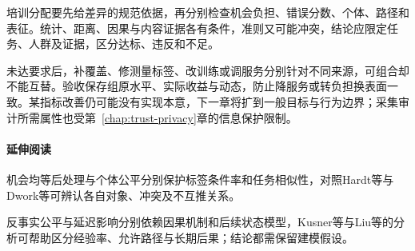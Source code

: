 培训分配要先给差异的规范依据，再分别检查机会负担、错误分数、个体、路径和表征。统计、距离、因果与内容证据各有条件，准则又可能冲突，结论应限定任务、人群及证据，区分达标、违反和不足。

未达要求后，补覆盖、修测量标签、改训练或调服务分别针对不同来源，可组合却不能互替。验收保存组原水平、实际收益与动态，防止降服务或转负担换表面一致。某指标改善仍可能没有实现本意，下一章将扩到一般目标与行为边界；采集审计所需属性也受第~\ref{chap:trust-privacy}章的信息保护限制。

\paragraph{延伸阅读}

机会均等后处理与个体公平分别保护标签条件率和任务相似性，对照Hardt等与Dwork等可辨认各自对象、冲突及不互推关系。

反事实公平与延迟影响分别依赖因果机制和后续状态模型，Kusner等与Liu等的分析可帮助区分经验率、允许路径与长期后果；结论都需保留建模假设。
